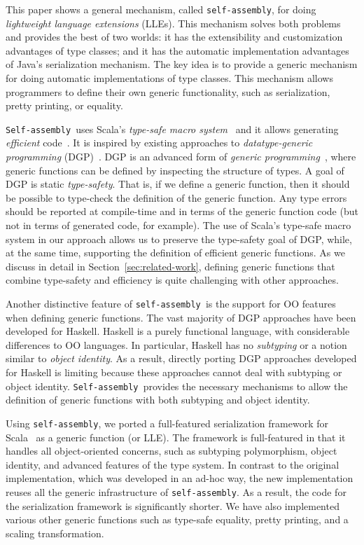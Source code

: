 \documentclass[preprint,nocopyrightspace]{sigplanconf}
\newcommand{\selfassembly}{\texttt{self-assembly~}}
\newcommand{\Selfassembly}{\texttt{Self-assembly~}}
\newcommand{\sselfassembly}{\texttt{self-assembly}}
\begin{document}
This paper shows a general mechanism, called \sselfassembly, for doing \emph{lightweight
  language extensions} (LLEs). This mechanism solves both problems and
provides the best of two worlds: it has the extensibility and
customization advantages of type classes; and it has the automatic
implementation advantages of Java's serialization mechanism.  The key
idea is to provide a generic mechanism for doing automatic
implementations of type classes. This mechanism allows programmers
to define their own generic functionality, such as serialization,
pretty printing, or equality.

\Selfassembly uses Scala's \emph{type-safe macro
  system}~\cite{Burmako2012, Burmako2013} and it allows generating \emph{efficient} code~\cite{Pickling}.  It
is inspired by existing approaches to \emph{datatype-generic
  programming} (DGP)~\cite{ComparingGPHaskellRodriquez,
  ComparingGPHaskellHinze}. DGP is an advanced form of \emph{generic
programming}~\cite{GP}, where generic functions can be defined by
inspecting the structure of types. A goal of DGP is static
\emph{type-safety}. That is, if we define a generic function, then it
should be possible to type-check the definition of the generic
function. Any type errors should be reported at compile-time and in
terms of the generic function code (but not in terms of generated
code, for example). The use of Scala's type-safe macro
system in our approach allows us to preserve the type-safety goal of
DGP, while, at the same time, supporting the definition of efficient
generic functions.  As we discuss in detail in Section~\ref{sec:related-work}, defining
generic functions that combine type-safety and efficiency is quite
challenging with other approaches.

Another distinctive feature of \selfassembly is the support for OO
features when defining generic functions. The vast majority of DGP
approaches have been developed for Haskell. Haskell is a purely
functional language, with considerable differences to OO languages.
In particular, Haskell has no \emph{subtyping} or a
notion similar to \emph{object identity}. As a result, directly porting
DGP approaches developed for Haskell is limiting because these
approaches cannot deal with subtyping or object identity.
\Selfassembly provides the necessary mechanisms to allow
the definition of generic functions with both subtyping and object identity.

Using \sselfassembly, we ported a full-featured serialization
framework for Scala~\cite{Pickling} as a generic function (or LLE). The
framework is full-featured in that it handles all object-oriented
concerns, such as subtyping polymorphism, object identity, and
advanced features of the type system. In contrast to the original
implementation, which was developed in an ad-hoc way, the new
implementation reuses all the generic infrastructure of
\texttt{self-assembly}. As a result, the code for the serialization framework is
significantly shorter. We have also implemented various other
generic functions such as type-safe equality, pretty printing, and
a scaling transformation.
\end{document}
